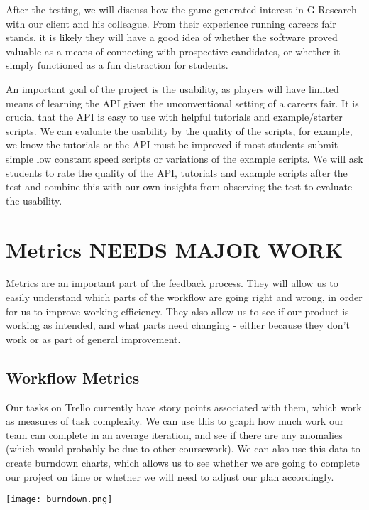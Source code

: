 After the testing, we will discuss how the game generated interest in G-Research with our client and his colleague. From their experience running careers fair stands, it is likely they will have a good idea of whether the software proved valuable as a means of connecting with prospective candidates, or whether it simply functioned as a fun distraction for students. 

An important goal of the project is the usability, as players will have limited means of learning the API given the unconventional setting of a careers fair. It is crucial that the API is easy to use with helpful tutorials and example/starter scripts. We can evaluate the usability by the quality of the scripts, for example, we know the tutorials or the API must be improved if most students submit simple low constant speed scripts or variations of the example scripts. We will ask students to rate the quality of the API, tutorials and example scripts after the test and combine this with our own insights from observing the test to evaluate the usability.

\section{Metrics \bf NEEDS MAJOR WORK}
Metrics are an important part of the feedback process. They will allow us to easily understand which parts of the workflow are going right and wrong, in order for us to improve working efficiency. They also allow us to see if our product is working as intended, and what parts need changing - either because they don't work or as part of general improvement.

\subsection{Workflow Metrics}
Our tasks on Trello currently have story points associated with them, which work as measures of task complexity. We can use this to graph how much work our team can complete in an average iteration, and see if there are any anomalies (which would probably be due to other coursework). We can also use this data to create burndown charts, which allows us to see whether we are going to complete our project on time or whether we will need to adjust our plan accordingly. 

\begin{center}
\texttt{[image: burndown.png]}
\end{center}

